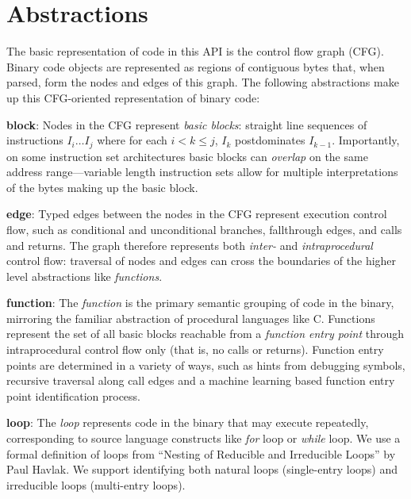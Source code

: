 \section{Abstractions}
\label{sec:abstractions}

The basic representation of code in this API is the control flow
graph (CFG). Binary code objects are represented as regions of contiguous bytes that, when parsed, form the nodes and edges of this graph. The following abstractions make up this CFG-oriented representation of binary code:

%
\begin{itemize}[leftmargin=0pt,label=$\circ$]


{\item \textbf{block}: Nodes in the CFG represent \emph{basic blocks}:
straight line sequences of instructions $I_i \ldots I_j$ where for each $i < k
\le j$, $I_k$ postdominates $I_{k-1}$. Importantly, on some instruction set architectures basic blocks can \emph{overlap} on the same address range---variable length instruction sets allow for multiple interpretations of the bytes making up the basic block.
}

{\item \textbf{edge}: Typed edges between the nodes in the CFG represent
execution control flow, such as conditional and unconditional branches,
fallthrough edges, and calls and returns. The graph therefore represents both
\emph{inter-} and \emph{intraprocedural} control flow: traversal of nodes and
edges can cross the boundaries of the higher level abstractions like
\emph{functions}.
}

{\item \textbf{function}:
The \emph{function} is the primary semantic grouping of code in the binary,
mirroring the familiar abstraction of procedural languages like C.
Functions represent the set of all basic blocks reachable from
a \emph{function entry point} through intraprocedural control flow
only (that is, no calls or returns).
Function entry points are determined in a variety of ways,
such as hints from debugging symbols, recursive traversal along call edges and
a machine learning based function entry point identification process.
}

{\item \textbf{loop}: The \emph{loop} represents code in the binary that may execute repeatedly,
corresponding to source language constructs like \emph{for} loop or \emph{while} loop.
We use a formal definition of loops from ``Nesting of Reducible and Irreducible Loops'' by Paul Havlak.
We support identifying both natural loops (single-entry loops) and irreducible loops (multi-entry loops).
}


\end{itemize}

